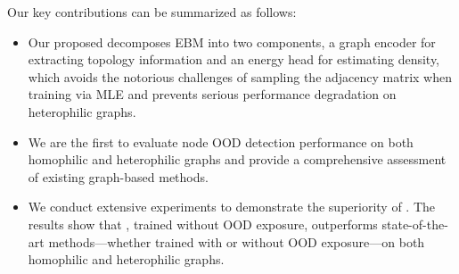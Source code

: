 


Our key contributions can be summarized as follows:
\begin{itemize}[nosep,leftmargin=20pt]
    \item Our proposed \shortname decomposes EBM into two components, a graph encoder for extracting topology information and an energy head for estimating density, which avoids the notorious challenges of sampling the adjacency matrix when training via MLE and prevents serious performance degradation on heterophilic graphs.
    \item We are the first to evaluate node OOD detection performance on both homophilic and heterophilic graphs and provide a comprehensive assessment of existing graph-based methods.
    \item We conduct extensive experiments to demonstrate the superiority of \shortname. The results show that \shortname, trained without OOD exposure, outperforms state-of-the-art methods—whether trained with or without OOD exposure—on both homophilic and heterophilic graphs. 
\end{itemize}
